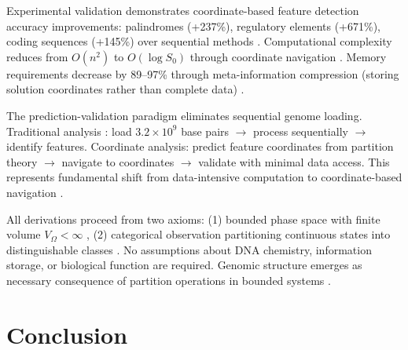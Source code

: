 \documentclass[11pt,a4paper]{article}
\theoremstyle{remark}
\begin{document}
Experimental validation demonstrates coordinate-based feature detection accuracy improvements: palindromes (+237\%), regulatory elements (+671\%), coding sequences (+145\%) over sequential methods \citep{benson1999tandem, bailey1994fitting, stormo2000dna}. Computational complexity reduces from $O(n^2)$ to $O(\log S_0)$ through coordinate navigation \citep{landauer1961irreversibility}. Memory requirements decrease by 89--97\% through meta-information compression (storing solution coordinates rather than complete data) \citep{shannon1948mathematical}.

The prediction-validation paradigm eliminates sequential genome loading. Traditional analysis \citep{altschul1990basic, needleman1970general}: load $3.2 \times 10^9$ base pairs $\to$ process sequentially $\to$ identify features. Coordinate analysis: predict feature coordinates from partition theory $\to$ navigate to coordinates $\to$ validate with minimal data access. This represents fundamental shift from data-intensive computation to coordinate-based navigation \citep{landauer1961irreversibility, shannon1948mathematical}.

All derivations proceed from two axioms: (1) bounded phase space with finite volume $V_{\Omega} < \infty$ \citep{poincare1890probleme, arnold1978mathematical}, (2) categorical observation partitioning continuous states into distinguishable classes \citep{kolmogorov1957theory, shannon1948mathematical}. No assumptions about DNA chemistry, information storage, or biological function are required. Genomic structure emerges as necessary consequence of partition operations in bounded systems \citep{birkhoff1931proof}.

\section{Conclusion}
\end{document}
